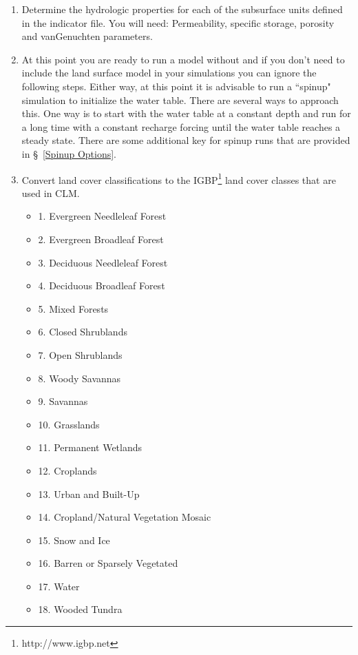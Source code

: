\begin{enumerate}
   \item Determine the hydrologic properties for each of the subsurface units defined in 
   the indicator file. You will need: Permeability, specific storage, porosity and 
   vanGenuchten parameters. 

   \item At this point you are ready to run a \parflow{} model without  and if you 
   don't need to include the land surface model in your simulations you can ignore the 
   following steps. Either way, at this point it is advisable to run a ``spinup" simulation 
   to initialize the water table. There are several ways to approach this. One way is to 
   start with the water table at a constant depth and run for 
   a long time with a constant recharge forcing until the water table reaches a steady 
   state. There are some additional key for spinup runs that are provided in \S~\ref{Spinup Options}.

   \item Convert land cover classifications to the IGBP\footnote{http://www.igbp.net}
   land cover classes that are used in CLM. 
   
   \begin{itemize}
		 \item[] 1. Evergreen Needleleaf Forest
		 \item[] 2. Evergreen Broadleaf Forest
		 \item[] 3. Deciduous Needleleaf Forest
		 \item[] 4. Deciduous Broadleaf Forest
		 \item[] 5. Mixed Forests
		 \item[] 6. Closed Shrublands
		 \item[] 7. Open Shrublands
		 \item[] 8. Woody Savannas
		 \item[] 9. Savannas
     	 \item[] 10. Grasslands
		 \item[] 11. Permanent Wetlands
		 \item[] 12. Croplands
		 \item[] 13. Urban and Built-Up
		 \item[] 14. Cropland/Natural Vegetation Mosaic
		 \item[] 15. Snow and Ice
		 \item[] 16. Barren or Sparsely Vegetated
		 \item[] 17. Water
		 \item[] 18. Wooded Tundra
  \end{itemize}


\end{enumerate}
